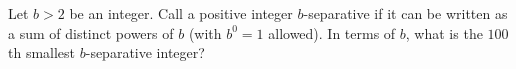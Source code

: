 Let $b>2$ be an integer. Call a positive integer $b$-separative if it can be written as a sum of distinct powers of $b$ (with $b^0=1$ allowed). In terms of $b$, what is the $100$th smallest $b$-separative integer?
